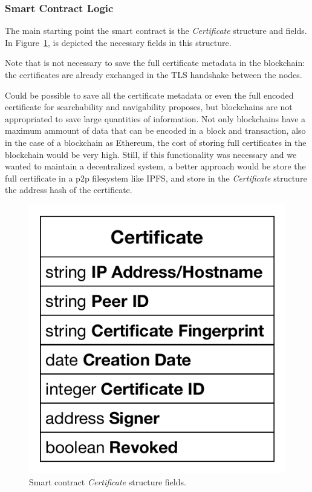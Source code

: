 \subsubsection{Smart Contract Logic}
The main starting point the smart contract is the \textit{Certificate} structure and fields.
In Figure~\ref{fig:certificate-structure}, is depicted the necessary fields in this structure.

Note that is not necessary to save the full certificate metadata in the blockchain: the certificates are already exchanged in the TLS handshake between the nodes.

Could be possible to save all the certificate metadata or even the full encoded certificate for searchability and navigability proposes, but blockchains are not appropriated to save large quantities of information.
Not only blockchains have a maximum ammount of data that can be encoded in a block and transaction, also in the case of a blockchain as Ethereum, the cost of storing full certificates in the blockchain would be very high.
Still, if this functionality was necessary and we wanted to maintain a decentralized system, a better approach would be store the full certificate in a \ac{p2p} filesystem like \ac{IPFS}, and store in the \textit{Certificate} structure the address hash of the certificate.

\begin{figure}[htb]
  \centering
  \includegraphics[scale=0.5]{Figures/certificate-structure.pdf}
  \caption{Smart contract \textit{Certificate} structure fields.}
\label{fig:certificate-structure}
\end{figure}

